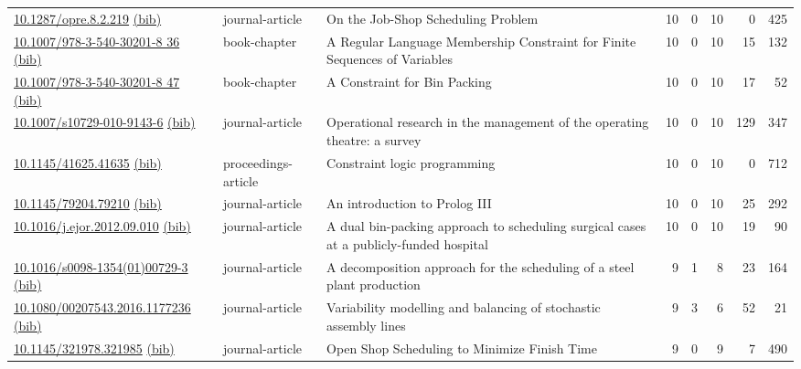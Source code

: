 {\begin{longtable}{p{5cm}lp{11cm}rrrrr}
\href{http://dx.doi.org/10.1287/opre.8.2.219}{10.1287/opre.8.2.219} \href{https://www.doi2bib.org/bib/10.1287/opre.8.2.219}{(bib)} & journal-article & On the Job-Shop Scheduling Problem & 10 & 0 & 10 & 0 & 425 \\
\href{http://dx.doi.org/10.1007/978-3-540-30201-8_36}{10.1007/978-3-540-30201-8 36} \href{https://www.doi2bib.org/bib/10.1007/978-3-540-30201-8_36}{(bib)} & book-chapter & A Regular Language Membership Constraint for Finite Sequences of Variables & 10 & 0 & 10 & 15 & 132 \\
\href{http://dx.doi.org/10.1007/978-3-540-30201-8_47}{10.1007/978-3-540-30201-8 47} \href{https://www.doi2bib.org/bib/10.1007/978-3-540-30201-8_47}{(bib)} & book-chapter & A Constraint for Bin Packing & 10 & 0 & 10 & 17 & 52 \\
\href{http://dx.doi.org/10.1007/s10729-010-9143-6}{10.1007/s10729-010-9143-6} \href{https://www.doi2bib.org/bib/10.1007/s10729-010-9143-6}{(bib)} & journal-article & Operational research in the management of the operating theatre: a survey & 10 & 0 & 10 & 129 & 347 \\
\href{http://dx.doi.org/10.1145/41625.41635}{10.1145/41625.41635} \href{https://www.doi2bib.org/bib/10.1145/41625.41635}{(bib)} & proceedings-article & Constraint logic programming & 10 & 0 & 10 & 0 & 712 \\
\href{http://dx.doi.org/10.1145/79204.79210}{10.1145/79204.79210} \href{https://www.doi2bib.org/bib/10.1145/79204.79210}{(bib)} & journal-article & An introduction to Prolog III & 10 & 0 & 10 & 25 & 292 \\
\href{http://dx.doi.org/10.1016/j.ejor.2012.09.010}{10.1016/j.ejor.2012.09.010} \href{https://www.doi2bib.org/bib/10.1016/j.ejor.2012.09.010}{(bib)} & journal-article & A dual bin-packing approach to scheduling surgical cases at a publicly-funded hospital & 10 & 0 & 10 & 19 & 90 \\
\href{http://dx.doi.org/10.1016/s0098-1354(01)00729-3}{10.1016/s0098-1354(01)00729-3} \href{https://www.doi2bib.org/bib/10.1016/s0098-1354(01)00729-3}{(bib)} & journal-article & A decomposition approach for the scheduling of a steel plant production & 9 & 1 & 8 & 23 & 164 \\
\href{http://dx.doi.org/10.1080/00207543.2016.1177236}{10.1080/00207543.2016.1177236} \href{https://www.doi2bib.org/bib/10.1080/00207543.2016.1177236}{(bib)} & journal-article & Variability modelling and balancing of stochastic assembly lines & 9 & 3 & 6 & 52 & 21 \\
\href{http://dx.doi.org/10.1145/321978.321985}{10.1145/321978.321985} \href{https://www.doi2bib.org/bib/10.1145/321978.321985}{(bib)} & journal-article & Open Shop Scheduling to Minimize Finish Time & 9 & 0 & 9 & 7 & 490 \\

\end{longtable}}
